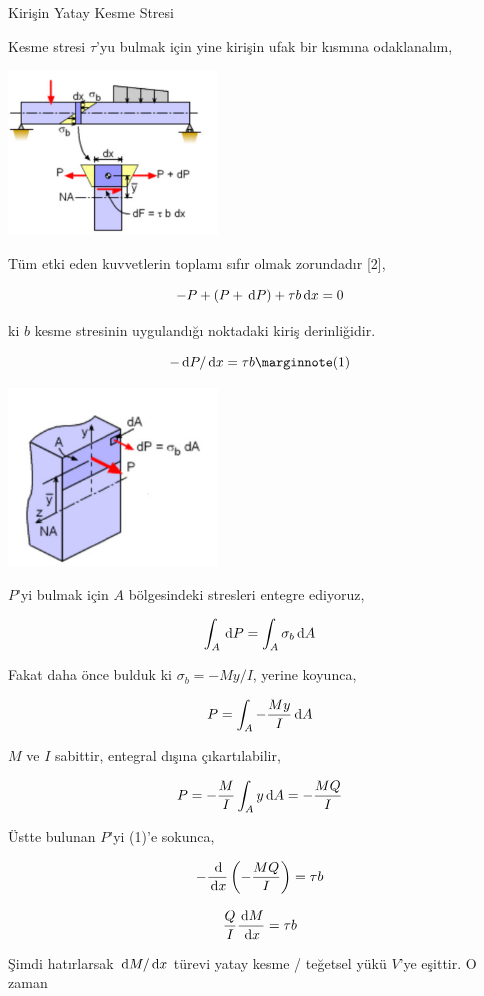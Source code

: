 \documentclass[12pt,fleqn]{article}\usepackage{../../common}
\begin{document}
Kirişin Yatay Kesme Stresi

Kesme stresi $\tau$'yu bulmak için yine kirişin ufak bir kısmına odaklanalım,

\includegraphics[width=15em]{phy_020_strs_01_05.jpg}

Tüm etki eden kuvvetlerin toplamı sıfır olmak zorundadır [2],

$$
-P + (P + \,\mathrm{d} P) + \tau b \,\mathrm{d} x = 0
$$

ki $b$ kesme stresinin uygulandığı noktadaki kiriş derinliğidir. 

$$
-\ud P/\ud x = \tau b
\mlabel{1}
$$

\includegraphics[width=15em]{phy_020_strs_00_01.jpg}

$P$'yi bulmak için $A$ bölgesindeki stresleri entegre ediyoruz,

$$
\int_A \,\mathrm{d} P = \int_A \sigma_b \,\mathrm{d} A
$$

Fakat daha önce bulduk ki $\sigma_b = -My / I$, yerine koyunca,

$$
P = \int_A - \frac{My}{I} \,\mathrm{d} A
$$

$M$ ve $I$ sabittir, entegral dışına çıkartılabilir,

$$
P = - \frac{M}{I} \int_A y \,\mathrm{d} A = - \frac{MQ}{I}
$$

Üstte bulunan $P$'yi (1)'e sokunca,

$$
- \frac{\,\mathrm{d}}{\,\mathrm{d} x} \left( - \frac{MQ}{I} \right) = \tau b
$$

$$
\frac{Q}{I} \frac{\,\mathrm{d} M}{\,\mathrm{d} x} = \tau b
$$

Şimdi hatırlarsak $\,\mathrm{d} M/\,\mathrm{d} x$ türevi yatay kesme / teğetsel yükü $V$'ye
eşittir. O zaman
\end{document}
